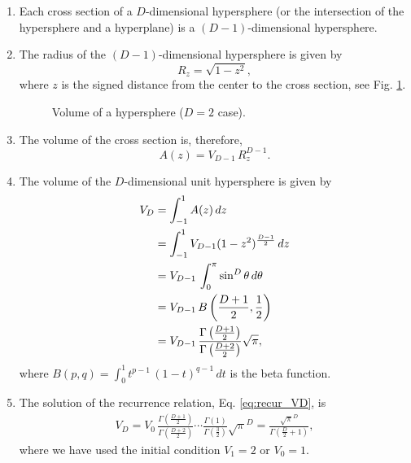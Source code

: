 \documentclass{article}
\begin{document}
\begin{enumerate}

\item
Each cross section of a $D$-dimensional hypersphere
(or the intersection of the hypersphere and a hyperplane)
is a
$(D-1)$-dimensional hypersphere.

\item
The radius of the $(D-1)$-dimensional hypersphere is given by
$$
R_z = \sqrt{ 1 - z^2 },
$$
where $z$ is the signed distance
from the center to the cross section,
see Fig. \ref{fig:vsphr}.

\begin{figure}[h]
\centering
{}
\caption{\label{fig:vsphr}
Volume of a hypersphere ($D = 2$ case).}
\end{figure}

\item
The volume of the cross section is, therefore,
$$
A(z) = V_{D-1} \, R_z^{ D - 1 }.
$$

\item
The volume of the $D$-dimensional unit hypersphere
is given by
%
\begin{align}
  V_D
  &=
  \int_{-1}^1 A(z) \, dz
  \notag
  \\
  &=
  \int_{-1}^1 V_{D - 1} (1 - z^2)^{ \frac{ D - 1 } { 2 } } \, dz
  \notag
  \\
  &=
  V_{D - 1} \,
  \int_0^\pi \sin^D \theta \, d \theta
  \notag
  \\
  &=
  V_{D - 1} \,
  B\left(
     \frac{ D + 1 } { 2 }, \frac 1 2
   \right)
  \notag
  \\
  &=
  V_{D - 1} \,
  \frac{  \Gamma\left( \frac{ D + 1 } { 2 } \right)  }
       {  \Gamma\left( \frac{ D + 2 } { 2 } \right)  }
  \sqrt{ \pi }
  ,
  \label{eq:recur_VD}
\end{align}
%
where
$B(p, q) = \int_0^1 t^{p-1} \, (1-t)^{q-1} \, dt$
is the beta function.

\item
The solution of the recurrence relation, Eq. \eqref{eq:recur_VD},
is
\begin{align*}
  V_D
  =
  V_0 \,
  \frac{  \Gamma\left( \frac{ D + 1 } { 2 } \right)  }
       {  \Gamma\left( \frac{ D + 2 } { 2 } \right)  }
  \cdots
  \frac{  \Gamma\left( 1 \right)  }
       {  \Gamma\left( \frac{ 3 } { 2 } \right)  }
  \sqrt{ \pi }^D
  =
  \frac{           \sqrt{ \pi }^D           }
       { \Gamma\left( \frac D 2 + 1 \right) }
  ,
\end{align*}
where we have used the initial condition
$V_1 = 2$ or $V_0 = 1$.


\end{enumerate}
\end{document}
